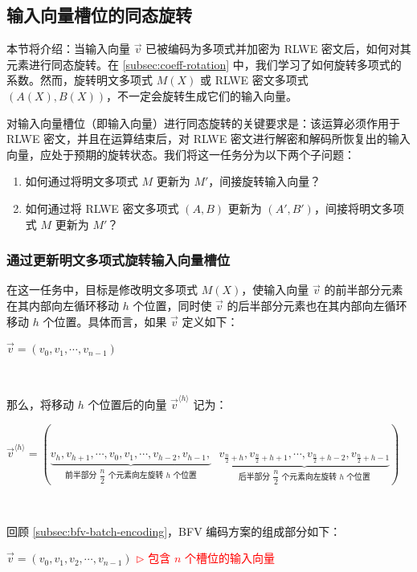 \subsection{输入向量槽位的同态旋转}
\label{subsec:bfv-rotation}


本节将介绍：当输入向量 $\vec{v}$ 已被编码为多项式并加密为 RLWE 密文后，如何对其元素进行同态旋转。在 \autoref{subsec:coeff-rotation} 中，我们学习了如何旋转多项式的系数。然而，旋转明文多项式 $M(X)$ 或 RLWE 密文多项式 $(A(X), B(X))$，不一定会旋转生成它们的输入向量。

对输入向量槽位（即输入向量）进行同态旋转的关键要求是：该运算必须作用于 RLWE 密文，并且在运算结束后，对 RLWE 密文进行解密和解码所恢复出的输入向量，应处于预期的旋转状态。我们将这一任务分为以下两个子问题：

\begin{enumerate}[leftmargin=3\parindent]
\item 如何通过将明文多项式 $M$ 更新为 $M'$，间接旋转输入向量？

\item 如何通过将 RLWE 密文多项式 $(A, B)$ 更新为 $(A', B')$，间接将明文多项式 $M$ 更新为 $M'$？
\end{enumerate}



\subsubsection{通过更新明文多项式旋转输入向量槽位}

在这一任务中，目标是修改明文多项式 $M(X)$，使输入向量 $\vec{v}$ 的前半部分元素在其内部向左循环移动 $h$ 个位置，同时使 $\vec{v}$ 的后半部分元素也在其内部向左循环移动 $h$ 个位置。具体而言，如果 $\vec{v}$ 定义如下：

$\vec{v} = (v_0, v_1, \cdots, v_{n-1})$

$ $

那么，将移动 $h$ 个位置后的向量 $\vec{v}^{\langle h \rangle}$ 记为：

$\vec{v}^{\langle h \rangle} = (\underbrace{v_h, v_{h+1}, \cdots, v_0, v_1, \cdots, v_{h-2}, v_{h-1},}_{\text{前半部分 $\dfrac{n}{2}$ 个元素向左旋转 $h$ 个位置}} \text{ } \underbrace{v_{\frac{n}{2}+h}, v_{\frac{n}{2}+h+1}, \cdots, v_{\frac{n}{2}+h-2}, v_{\frac{n}{2}+h-1}}_{\text{后半部分 $\dfrac{n}{2}$ 个元素向左旋转 $h$ 个位置}})$

$ $

回顾 \autoref{subsec:bfv-batch-encoding}，BFV 编码方案的组成部分如下：

$\vec{v} = (v_0, v_1, v_2, \cdots, v_{n-1})$ \textcolor{red}{ $\rhd$ 包含 $n$ 个槽位的输入向量}

